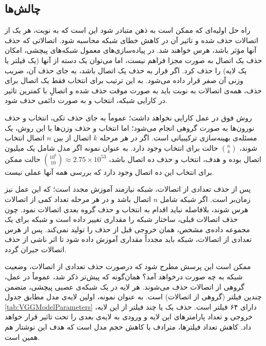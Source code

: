 \documentclass[11pt, twoside]{imsproc}
\begin{document}
\subsection{چالش‌ها}
\label{sec:Challenges}
راه حل اولیه‌ای که ممکن است به ذهن متبادر شود این است که به نوبت، هر یک از اتصالات حذف شده و تاثیر آن در کاهش خطای شبکه محاسبه شود.
اتصالاتی که حذف آنها مؤثر باشد،‌ هرس خواهند شد.
در پیاده‌سازی‌های معمول شبکه‌های پیچشی، امکان حذف یک اتصال به صورت مجزا فراهم نیست، اما می‌توان یک دسته از آنها (یک فیلتر یا یک لایه) را حذف کرد.
اگر قرار به حذف یک اتصال باشد،‌ به جای حذف آن، ضریب وزنی آن صفر قرار داده می‌شود.
به این ترتیب برای انتخاب فقط یک اتصال برای حذف، همه‌ی اتصالات به نوبت باید به صورت موقت حذف شده و
اتصالِ با کمترین تاثیر در کارایی شبکه، انتخاب و به صورت دائمی حذف شود.

روش فوق در عمل کارایی نخواهد داشت؛ عموماً به جای حذف تکی، انتخاب و حذف نورون‌ها به صورت گروهی انجام می‌شود؛
اما انتخاب و حذف وزن‌ها با این روش، یک مسئله‌ی بهینه‌سازی ترکیبیاتی است.
اگر در هر مرحله $k$‌ اتصال از بین $n$‌ اتصال انتخاب شوند،‌
$\binom{n}{k}$
حالت برای انتخاب وجود دارد.
به عنوان نمونه اگر مدل شامل یک میلیون اتصال بوده و هدف، انتخاب و حذف  ده اتصال باشد،
$\binom{10^6}{10}\approx 2.75\times10^{53}$
حالت ممکن برای انتخاب این ده اتصال وجود دارد که بررسی همه آنها عملی نیست.

پس از حذف تعدادی از اتصالات، شبکه نیازمند آموزش مجدد است؛ که این عمل نیز زمان‌بر است.
اگر
شبکه شامل
$n$
اتصال باشد و در هر مرحله تعداد کمی از اتصالات هرس شوند،
بلافاصله نباید اقدام به انتخاب و حذف گروه بعدی اتصالات  نمود.
چون حذف  اتصالات قبلی، ساختار شبکه را مقداری تغییر داده است و شبکه برای یک مجموعه داده‌ی مشخص،‌ همان خروجی قبل از حذف  را تولید نمی‌کند. پس از هرس تعدادی از اتصالات، شبکه باید مجدداً مقداری آموزش داده شود تا اثر ناشی از حذف اتصالات جبران گردد.

ممکن است این پرسش مطرح شود که درصورت حذف تعدادی از اتصالات، وضعیت شبکه به چه صورت درخواهد آمد؟ همان‌گونه که پیش‌تر ذکر شد، عموماً در عمل، گروهی از اتصالات حذف می‌شوند. هر لایه در یک شبکه‌ی عصبی پیچشی، متضمن چندین فیلتر (گروهی از اتصالات) است. به عنوان نمونه،‌ اولین لایه‌ی مدل
مطابق جدول
\ref{tab:VGGModelParameters}
دارای ۶۴ فیلتر است.
حذف یک یا چند فیلتر از این لایه، خروجی و تعداد پارامترهای این لایه و ورودی به لایه‌ی بعدی را  تحت تاثیر قرار خواهد داد.
کاهش تعداد فیلترها، مترادف با کاهش حجم مدل است که هدف این نوشتار هم همین است.
\end{document}
